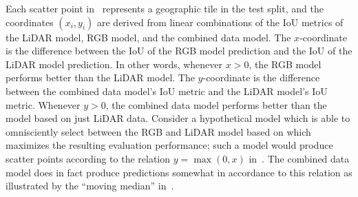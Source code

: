 Each scatter point in~ represents a geographic tile in the test split, and the coordinates $(x_i, y_i)$ are derived from linear combinations of the IoU metrics of the LiDAR model, RGB model, and the combined data model.
The $x$-coordinate is the difference between the IoU of the RGB model prediction and the IoU of the LiDAR model prediction.
In other words, whenever $x > 0$, the RGB model performs better than the LiDAR model.
The $y$-coordinate is the difference between the combined data model's IoU metric and the LiDAR model's IoU metric.
Whenever $y > 0$, the combined data model performs better than the model based on just LiDAR data.
Consider a hypothetical model which is able to omnisciently select between the RGB and LiDAR model based on which maximizes the resulting evaluation performance; such a model would produce scatter points according to the relation $y = \max(0, x)$ in~.
The combined data model does in fact produce predictions somewhat in accordance to this relation as illustrated by the \enquote{moving median} in~.
